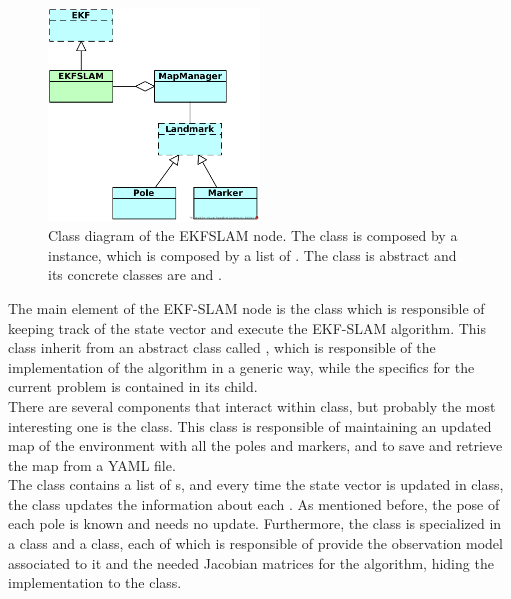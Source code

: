 \begin{figure}
    \centering
    \includegraphics[width=0.5\textwidth]{Images/fig10-class_diagram}
    \caption[Class diagram of the EKFSLAM node]{Class diagram of the EKFSLAM node. The  class is composed by a  instance, which is composed by a list of . The  class is abstract and its concrete classes are  and .}
    \label{fig:chapter2:architecture:class}
\end{figure}

The main element of the EKF-SLAM node is the  class which is responsible of keeping track of the state vector and execute the EKF-SLAM algorithm. This class inherit from an abstract class called , which is responsible of the implementation of the algorithm in a generic way, while the specifics for the current problem is contained in its child.\\

There are several components that interact within  class, but probably the most interesting one is the  class. This class is responsible of maintaining an updated map of the environment with all the poles and markers, and to save and retrieve the map from a YAML file.\\

The  class contains a list of s, and every time the state vector is updated in  class, the  class updates the information about each . As mentioned before, the pose of each pole is known and needs no update. Furthermore, the  class is specialized in a  class and a  class, each of which is responsible of provide the observation model associated to it and the needed Jacobian matrices for the algorithm, hiding the implementation to the  class.
